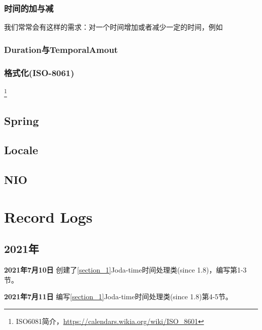 \documentclass[cn,10pt,math=newtx,citestyle=gb7714-2015,bibstyle=gb7714-2015]{elegantbook}
\begin{document}
    \begin{lstlisting}[language=Kotlin]

    \end{lstlisting}

    \subsection{时间的加与减}

    我们常常会有这样的需求：对一个时间增加或者减少一定的时间，例如

    \subsection{Duration与TemporalAmout}

    \subsection{格式化(ISO-8061)}

    \footnote{
        ISO6081简介，\url{https://calendars.wikia.org/wiki/ISO_8601}
    }

    \section{Spring}

    \section{Locale}

    \section{NIO}



    \chapter{Record Logs}

    \section{2021年}

    \textbf{2021年7月10日} 创建了\ref{section_1}Joda-time时间处理类(since 1.8)，编写第1-3节。
    
    \textbf{2021年7月11日} 编写\ref{section_1}Joda-time时间处理类(since 1.8)第4-5节。
    
\end{document}

